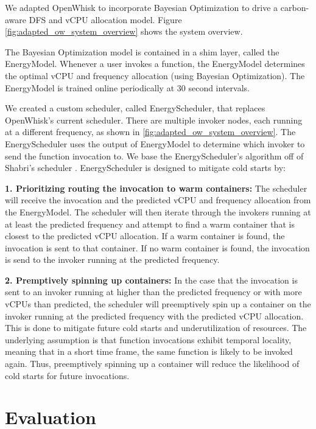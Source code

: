 \documentclass[times, 10pt,twocolumn]{article}
\begin{document}
We adapted OpenWhisk to incorporate Bayesian Optimization to drive a carbon-aware DFS and vCPU allocation model. Figure \ref{fig:adapted_ow_system_overview} shows the system overview.

The Bayesian Optimization model is contained in a shim layer, called the EnergyModel. Whenever a user invokes a function, the EnergyModel determines the optimal vCPU and frequency allocation (using Bayesian Optimization). The EnergyModel is trained online periodically at 30 second intervals.

We created a custom scheduler, called EnergyScheduler, that replaces OpenWhisk's current scheduler. There are multiple invoker nodes, each running at a different frequency, as shown in \ref{fig:adapted_ow_system_overview}. The EnergyScheduler uses the output of EnergyModel to determine which invoker to send the function invocation to. We base the EnergyScheduler's algorithm off of Shabri's scheduler \cite{sinha2024shabari}. EnergyScheduler is designed to mitigate cold starts by:

\textbf{1. Prioritizing routing the invocation to warm containers: } The scheduler will receive the invocation and the predicted vCPU and frequency allocation from the EnergyModel. The scheduler will then iterate through the invokers running at at least the predicted frequency and attempt to find a warm container that is closest to the predicted vCPU allocation. If a warm container is found, the invocation is sent to that container. If no warm container is found, the invocation is send to the invoker running at the predicted frequency.

\textbf{2. Premptively spinning up containers: } In the case that the invocation is sent to an invoker running at higher than the predicted frequency or with more vCPUs than predicted, the scheduler will preemptively spin up a container on the invoker running at the predicted frequency with the predicted vCPU allocation. This is done to mitigate future cold starts and underutilization of resources. The underlying assumption is that function invocations exhibit temporal locality, meaning that in a short time frame, the same function is likely to be invoked again. Thus, preemptively spinning up a container will reduce the likelihood of cold starts for future invocations.

\section{Evaluation}
\end{document}
